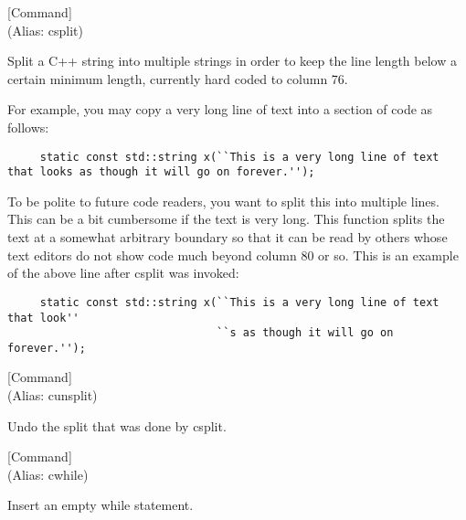 \vspace{1em}
\noindent
{}
\usebox{\funcname}
 \hfill [Command]\\%
 (Alias: csplit)

\begin{doc-string}
Split a C++ string into multiple strings in order to keep the line length
below a certain minimum length, currently hard coded to column 76.

For example, you may copy a very long line of text into a section of code as
follows:

\small{\begin{verbatim}
     static const std::string x(``This is a very long line of text that looks as though it will go on forever.'');
\end{verbatim}}

To be polite to future code readers, you want to split this into multiple lines.
This can be a bit cumbersome if the text is very long.  This function splits the
text at a somewhat arbitrary boundary so that it can be read by others whose
text editors do not show code much beyond column 80 or so.  This is an example
of the above line after csplit was invoked:

\small{\begin{verbatim}
     static const std::string x(``This is a very long line of text that look''
                                ``s as though it will go on forever.'');
\end{verbatim}}
\end{doc-string}

\vspace{1em}
\noindent
{}
\usebox{\funcname}
 \hfill [Command]\\%
 (Alias: cunsplit)

\begin{doc-string}
Undo the split that was done by csplit.
\end{doc-string}

\vspace{1em}
\noindent
{}
\usebox{\funcname}
 \hfill [Command]\\%
 (Alias: cwhile)

\begin{doc-string}
Insert an empty while statement.
\end{doc-string}

